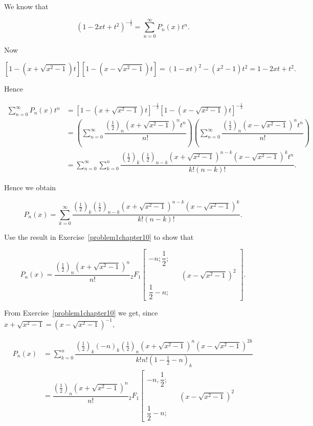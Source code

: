 \begin{solution}
We know that

$$(1-2xt+t^2)^{-\frac{1}{2}} = \displaystyle\sum_{n=0}^{\infty} P_n(x) t^n.$$

Now

$$[1 - (x+\sqrt{x^2-1})t][1-(x-\sqrt{x^2-1})t] = (1-xt)^2 - (x^2-1)t^2 = 1-2xt+t^2.$$

Hence

$$\begin{array}{ll}
\displaystyle\sum_{n=0}^{\infty} P_n(x) t^n &= [1-(x+\sqrt{x^2-1})t]^{-\frac{1}{2}} [1- (x-\sqrt{x^2-1})t]^{-\frac{1}{2}} \\
&= \left( \displaystyle\sum_{n=0}^{\infty} \dfrac{(\frac{1}{2})_n (x + \sqrt{x^2-1})^n t^n}{n!} \right) \left( \displaystyle\sum_{n=0}^{\infty} \dfrac{(\frac{1}{2})_n (x - \sqrt{x^2-1})^n t^n}{n!} \right) \\
&= \displaystyle\sum_{n=0}^{\infty} \displaystyle\sum_{k=0}^{n} \dfrac{(\frac{1}{2})_k (\frac{1}{2})_{n-k} (x + \sqrt{x^2-1})^{n-k} (x - \sqrt{x^2-1})^k t^n}{k! (n-k)!}.
\end{array}$$

Hence we obtain

$$P_n(x) = \displaystyle\sum_{k=0}^{\infty} \dfrac{(\frac{1}{2})_k (\frac{1}{2})_{n-k} (x + \sqrt{x^2-1})^{n-k} (x - \sqrt{x^2-1})^k}{k! (n-k)!}.$$
\end{solution}
\begin{problem}\label{problem2chapter10}
Use the result in Exercise~\ref{problem1chapter10} to show that

$$P_n(x) = \dfrac{(\frac{1}{2})_n (x + \sqrt{x^2-1})^n}{n!} {}_2F_1 \left[ \begin{array}{rlr}
-n; \dfrac{1}{2}; & & \\
& & (x - \sqrt{x^2-1})^2 \\
\dfrac{1}{2}-n; & & 
\end{array} \right].$$
\end{problem}
\begin{solution}
From Exercise~\ref{problem1chapter10} we get, since $x + \sqrt{x^2-1} = (x - \sqrt{x^2-1})^{-1},$

$$\begin{array}{ll}
P_n(x) &= \displaystyle\sum_{k=0}^n \dfrac{(\frac{1}{2})_k (-n)_k (\frac{1}{2})_n (x + \sqrt{x^2-1})^n (x - \sqrt{x^2-1})^{2k}}{k! n! (1 - \frac{1}{2} - n)_k} \\
&= \dfrac{(\frac{1}{2})_n (x + \sqrt{x^2-1})^n}{n!} {}_2F_1 \left[ \begin{array}{rlr}
-n, \dfrac{1}{2}; & & \\
& & (x - \sqrt{x^2-1})^2 \\
\dfrac{1}{2} - n; & & 
\end{array} \right.
\end{array}$$
\end{solution}
